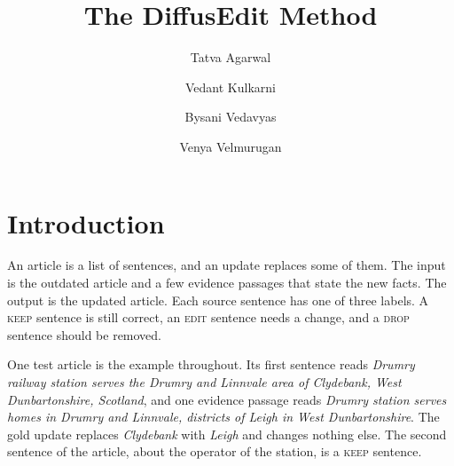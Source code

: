 \documentclass[]{paper}
\newcommand{\keep}{\textsc{keep}}
\newcommand{\edit}{\textsc{edit}}
\newcommand{\drop}{\textsc{drop}}
\begin{document}
\title{The DiffusEdit Method}

\author[*]{Tatva Agarwal}
\author[*]{Vedant Kulkarni}
\author[*]{Bysani Vedavyas}
\author[*]{Venya Velmurugan}




\date{}

\maketitle{}

\section{Introduction}
\label{sec:intro}

An article is a list of sentences, and an update replaces some of them. The input is the outdated article and a few evidence passages that state the new facts. The output is the updated article. Each source sentence has one of three labels. A \keep{} sentence is still correct, an \edit{} sentence needs a change, and a \drop{} sentence should be removed.

One test article is the example throughout. Its first sentence reads \emph{Drumry railway station serves the Drumry and Linnvale area of Clydebank, West Dunbartonshire, Scotland}, and one evidence passage reads \emph{Drumry station serves homes in Drumry and Linnvale, districts of Leigh in West Dunbartonshire}. The gold update replaces \emph{Clydebank} with \emph{Leigh} and changes nothing else. The second sentence of the article, about the operator of the station, is a \keep{} sentence.
\end{document}
